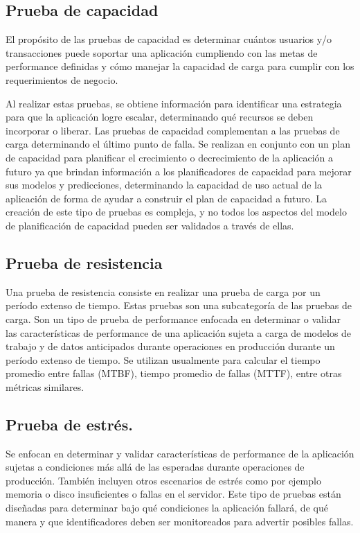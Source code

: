 	\subsection{Prueba de capacidad}
	El propósito de las pruebas de capacidad es determinar cuántos usuarios y/o transacciones puede soportar una aplicación cumpliendo con las metas de performance definidas y cómo manejar la capacidad de carga para cumplir con los requerimientos de negocio. 
	
	Al realizar estas pruebas, se obtiene información para identificar una estrategia para que la aplicación logre escalar, determinando qué recursos se deben incorporar o liberar. 
	Las pruebas de capacidad complementan a las pruebas de carga determinando el último punto de falla.
	Se realizan en conjunto con un plan de capacidad para planificar el crecimiento o decrecimiento de la aplicación a futuro ya que brindan información a los planificadores de capacidad  para mejorar sus modelos y predicciones, determinando la capacidad de uso actual de la aplicación de forma de ayudar a construir el plan de capacidad a futuro.
		La creación de este tipo de pruebas es compleja, y no todos los aspectos del modelo de planificación de capacidad pueden ser validados a través de ellas.

    \subsection{Prueba de resistencia}
    Una prueba de resistencia consiste en realizar una prueba de carga por un período extenso de tiempo. Estas pruebas son una subcategoría de las pruebas de carga. Son un tipo de prueba de performance enfocada en determinar o validar las características de performance de una aplicación sujeta a carga de modelos de trabajo y de datos anticipados durante operaciones en producción durante un período extenso de	tiempo. Se utilizan usualmente para calcular el tiempo promedio entre fallas (MTBF), tiempo promedio de fallas (MTTF), entre otras métricas similares. 	
    
	\subsection{Prueba de estrés.}
	Se enfocan en determinar y validar características de performance de la aplicación sujetas a condiciones más allá de las esperadas durante operaciones de producción. También incluyen otros escenarios de estrés como por ejemplo memoria o disco insuficientes o fallas en el servidor. Este tipo
de pruebas están diseñadas para determinar bajo qué condiciones la aplicación fallará, de qué manera y que identificadores deben ser monitoreados para advertir posibles fallas.

